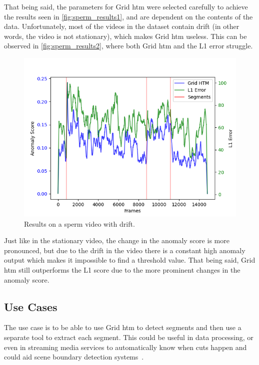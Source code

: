 \par
That being said, the parameters for Grid \gls*{htm} were selected carefully to achieve the results seen in \autoref{fig:sperm_results1}, and are dependent on the contents of the data. Unfortunately, most of the videos in the dataset contain drift (in other words, the video is not stationary), which makes Grid \gls*{htm} useless. This can be observed in \autoref{fig:sperm_results2}, where both Grid \gls*{htm} and the L1 error struggle.
\begin{figure}[htb]
    \centering
    \includegraphics[width=\textwidth]{resources/experiments/sperm/sperm_result2.png}
    \caption[Drifting Video Results]{Results on a sperm video with drift.}
    \label{fig:sperm_results2}
\end{figure}
Just like in the stationary video, the change in the anomaly score is more pronounced, but due to the drift in the video there is a constant high anomaly output which makes it impossible to find a threshold value. That being said, Grid \gls*{htm} still outperforms the L1 score due to the more prominent changes in the anomaly score.
\subsection{Use Cases}
The use case is to be able to use Grid \gls*{htm} to detect segments and then use a separate tool to extract each segment. This could be useful in data processing, or even in streaming media services to automatically know when cuts happen and could aid scene boundary detection systems~\cite{scene_boundary_detection}.
